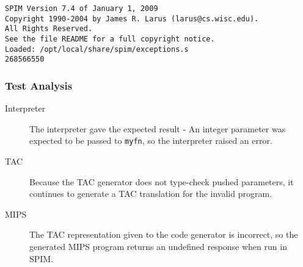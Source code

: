 \begin{verbatim}
SPIM Version 7.4 of January 1, 2009
Copyright 1990-2004 by James R. Larus (larus@cs.wisc.edu).
All Rights Reserved.
See the file README for a full copyright notice.
Loaded: /opt/local/share/spim/exceptions.s
268566550
\end{verbatim}
\subsubsection{Test Analysis}
\begin{description}
	\item[Interpreter] The interpreter gave the expected result - An integer parameter was expected to be passed to \verb!myfn!, so the interpreter raised an error.
	\item[TAC] Because the TAC generator does not type-check pushed parameters, it continues to generate a TAC translation for the invalid program.
	\item[MIPS] The TAC representation given to the code generator is incorrect, so the generated MIPS program returns an undefined response when run in SPIM.
\end{description}
